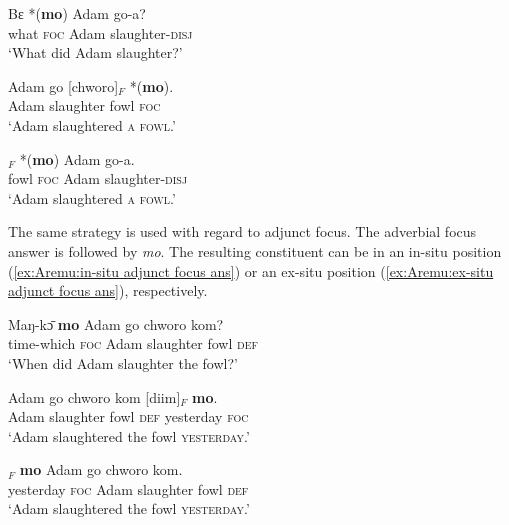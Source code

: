 \documentclass[output=paper,colorlinks,citecolor=brown,draftmode
]{langscibook}
\begin{document}
\ea \label{ex:Aremu:FirstEx}
\begin{xlist}

\ex \label{ex:Aremu:object wh-question}
\gll Bɛ *(\textbf{mo}) Adam go-a?\\
     what \textsc{foc} Adam slaughter-\textsc{disj}\\
\glt  `What did Adam slaughter?' 

\ex \label{ex:Aremu:in-situ object focus ans}
\gll  Adam go [chworo]$_F$ *(\textbf{mo}).\\
	    Adam slaughter fowl \textsc{foc}\\
\glt  `Adam slaughtered \textsc{a fowl}.'

\ex \label{ex:Aremu:ex-situ object focus ans2}
\gll  [Chworo]$_F$ *(\textbf{mo}) Adam go-a.\\
		fowl \textsc{foc} Adam slaughter-\textsc{disj}\\
\glt 	`Adam slaughtered \textsc{a fowl}.'

\end{xlist}

\z 

The same strategy is used with regard to adjunct focus. The adverbial focus answer is followed by \textit{mo}. The resulting constituent can be in an in-situ position (\ref{ex:Aremu:in-situ adjunct focus ans}) or an ex-situ position (\ref{ex:Aremu:ex-situ adjunct focus ans}), respectively.

\ea \label{ex:Aremu:2ndEx}
\begin{xlist}

\ex \label{ex:Aremu:adjunct wh-question}
    \gll Maŋ-kɔ̄ \textbf{mo} Adam go chworo kom?\\
		time-which \textsc{foc} Adam slaughter fowl \textsc{def}\\
	\glt `When did Adam slaughter the fowl?'
  
    \ex \label{ex:Aremu:in-situ adjunct focus ans}
    \gll Adam go chworo kom [diim]$_F$ \textbf{mo}.\\
		Adam slaughter fowl \textsc{def} yesterday \textsc{foc}\\
	\glt `Adam slaughtered the fowl \textsc{yesterday}.'
  
	\ex \label{ex:Aremu:ex-situ adjunct focus ans}
    \gll [Diim]$_F$ \textbf{mo} Adam go chworo kom.\\
	    yesterday \textsc{foc} Adam slaughter fowl \textsc{def}\\
	\glt  `Adam slaughtered the fowl \textsc{yesterday}.'

\end{xlist}
\end{document}
